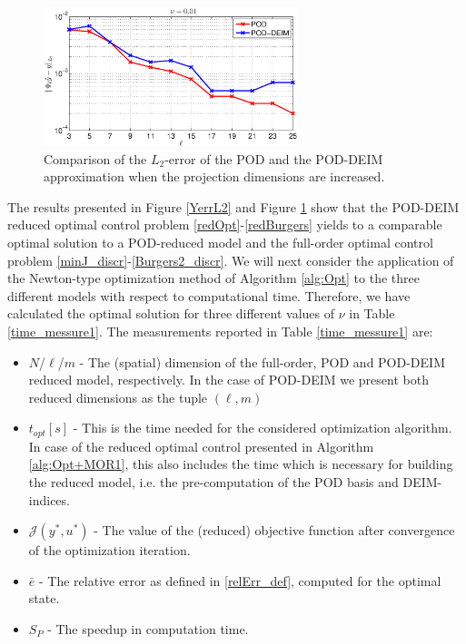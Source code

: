 \begin{figure}[H]
\centering
\includegraphics[width=0.66\textwidth]{plots/yL2err}
\caption{Comparison of the $L_2$-error of the POD and the POD-DEIM approximation when the projection dimensions are increased.}\label{L2err}
\end{figure}
The results presented in Figure \ref{YerrL2} and Figure \ref{L2err} show that the POD-DEIM reduced optimal control problem \eqref{redOpt}-\eqref{redBurgers} yields to a comparable optimal solution to a POD-reduced model and the full-order optimal control problem \eqref{minJ_discr}-\eqref{Burgers2_discr}. We will next consider the application of the Newton-type optimization method of Algorithm \ref{alg:Opt} to the three different models with respect to computational time. Therefore, we have calculated the optimal solution for three different values of $\nu$ in Table \ref{time_messure1}. The measurements reported in Table \ref{time_messure1} are:
\begin{itemize}
 \item $N$/$\ell$/$m$ - The (spatial) dimension of the full-order, POD and POD-DEIM reduced model, respectively. In the case of POD-DEIM we present both reduced dimensions as the tuple $(\ell,m)$
 \item $t_{opt}[s]$ - This is the time needed for the considered optimization algorithm. In case of the reduced optimal control presented in Algorithm \ref{alg:Opt+MOR1}, this also includes the time which is necessary for building the reduced model, i.e. the pre-computation of the POD basis and DEIM-indices.
 \item $\mathcal{J}(y^*,u^*)$ - The value of the (reduced) objective function after convergence of the optimization iteration.
 \item $\bar{e}$ - The relative error as defined in \eqref{relErr_def}, computed for the optimal state.
 \item $S_P$ - The speedup in computation time.
\end{itemize}
\newpage
